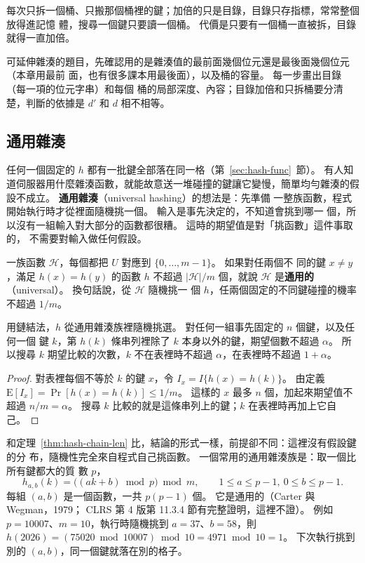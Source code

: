 每次只拆一個桶、只搬那個桶裡的鍵；加倍的只是目錄，目錄只存指標，常常整個放得進記憶
體，搜尋一個鍵只要讀一個桶。 代價是只要有一個桶一直被拆，目錄就得一直加倍。

\begin{examnote}
可延伸雜湊的題目，先確認用的是雜湊值的最前面幾個位元還是最後面幾個位元（本章用最前
面，也有很多課本用最後面），以及桶的容量。 每一步畫出目錄（每一項的位元字串）和每個
桶的局部深度、內容；目錄加倍和只拆桶要分清楚，判斷的依據是 $d'$ 和 $d$ 相不相等。
\end{examnote}

\subsection{通用雜湊}

任何一個固定的 $h$ 都有一批鍵全部落在同一格（第~\ref{sec:hash-func}~節）。 有人知
道伺服器用什麼雜湊函數，就能故意送一堆碰撞的鍵讓它變慢，簡單均勻雜湊的假設不成立。 \textbf{通用雜湊}（universal hashing）的想法是：先準備
一整族函數，程式開始執行時才從裡面隨機挑一個。 輸入是事先決定的，不知道會挑到哪一
個，所以沒有一組輸入對大部分的函數都很糟。 這時的期望值是對「挑函數」這件事取的，
不需要對輸入做任何假設。

\begin{definition}[通用雜湊族]
\label{def:hash-universal}
一族函數 $\mathcal{H}$，每個都把 $U$ 對應到 $\{0, \ldots, m-1\}$。 如果對任兩個不
同的鍵 $x \ne y$，滿足 $h(x) = h(y)$ 的函數 $h$ 不超過 $|\mathcal{H}|/m$ 個，就說
$\mathcal{H}$ 是\textbf{通用的}（universal）。 換句話說，從 $\mathcal{H}$ 隨機挑一
個 $h$，任兩個固定的不同鍵碰撞的機率不超過 $1/m$。
\end{definition}

\begin{theorem}
\label{thm:hash-universal}
用鏈結法，$h$ 從通用雜湊族裡隨機挑選。 對任何一組事先固定的 $n$ 個鍵，以及任何一個
鍵 $k$，第 $h(k)$ 條串列裡除了 $k$ 本身以外的鍵，期望個數不超過 $\alpha$。 所以搜尋
$k$ 期望比較的次數，$k$ 不在表裡時不超過 $\alpha$，在表裡時不超過 $1 + \alpha$。
\end{theorem}

\begin{proof}
對表裡每個不等於 $k$ 的鍵 $x$，令 $I_x = I\{h(x) = h(k)\}$。 由定義
$\mathrm{E}[I_x] = \Pr[h(x) = h(k)] \le 1/m$。 這樣的 $x$ 最多 $n$ 個，加起來期望值不
超過 $n/m = \alpha$。 搜尋 $k$ 比較的就是這條串列上的鍵；$k$ 在表裡時再加上它自己。
\end{proof}

和定理~\ref{thm:hash-chain-len} 比，結論的形式一樣，前提卻不同：這裡沒有假設鍵的分
布，隨機性完全來自程式自己挑函數。 一個常用的通用雜湊族是：取一個比所有鍵都大的質
數 $p$，
\[
h_{a,b}(k) = \bigl( (ak + b) \bmod p \bigr) \bmod m, \qquad
1 \le a \le p - 1,\ 0 \le b \le p - 1.
\]
每組 $(a, b)$ 是一個函數，一共 $p(p-1)$ 個。 它是通用的（Carter 與 Wegman，1979；
CLRS 第 4 版第 11.3.4 節有完整證明，這裡不證）。 例如 $p = 10007$、$m = 10$，執行時隨機挑到
$a = 37$、$b = 58$，則 $h(2026) = (75020 \bmod 10007) \bmod 10 = 4971 \bmod 10 = 1$。
下次執行挑到別的 $(a, b)$，同一個鍵就落在別的格子。

